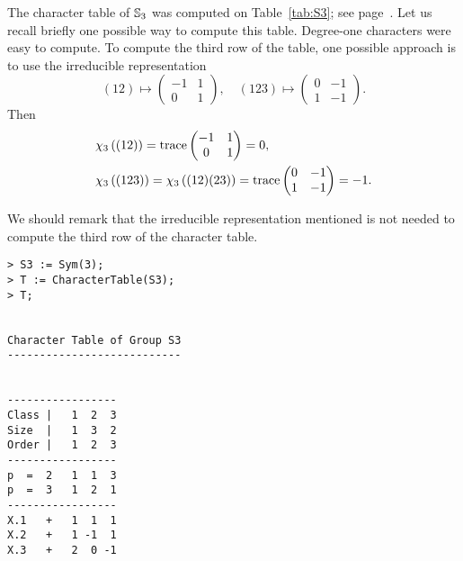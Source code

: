 \begin{example}
	The character table of $\mathbb{S}_3$ was computed on Table~\ref{tab:S3}; see page~\pageref{tab:S3}. 
	Let us recall briefly one possible way to compute this table. 
	Degree-one characters were easy to compute. 
	To compute the third row of the table, one possible approach is to use
	the irreducible representation  
	\[
	(12)\mapsto \begin{pmatrix}-1&1\\0&1\end{pmatrix},
	\quad
	(123)\mapsto \begin{pmatrix}0&-1\\1&-1\end{pmatrix}.
	\]
    Then	
    \begin{align*}
		&\chi_3\left( (12) \right)=\operatorname{trace}\begin{pmatrix}-1&1\\0&1\end{pmatrix}=0,\\
		&\chi_3\left( (123) \right)=\chi_3\left( (12)(23)\right)=\operatorname{trace}\begin{pmatrix}0&-1\\1&-1\end{pmatrix}=-1.
	\end{align*}

	We should remark that the irreducible representation 
	mentioned is not needed to
	compute the third row of the character table. 
\begin{lstlisting}
> S3 := Sym(3);
> T := CharacterTable(S3);
> T;


Character Table of Group S3
---------------------------


-----------------
Class |   1  2  3
Size  |   1  3  2
Order |   1  2  3
-----------------
p  =  2   1  1  3
p  =  3   1  2  1
-----------------
X.1   +   1  1  1
X.2   +   1 -1  1
X.3   +   2  0 -1    
\end{lstlisting}




\end{example}
